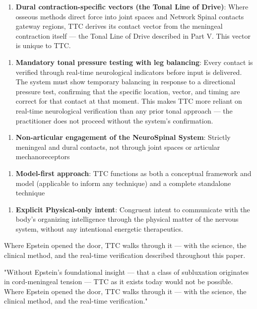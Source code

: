 \documentclass[11pt,letterpaper]{article}
\begin{document}
\begin{enumerate}
\item \textbf{Dural contraction-specific vectors (the Tonal Line of Drive)}: Where osseous methods direct force into joint spaces and Network Spinal contacts gateway regions, TTC derives its contact vector from the meningeal contraction itself — the Tonal Line of Drive described in Part V. This vector is unique to TTC.
\end{enumerate}

\begin{enumerate}
\item \textbf{Mandatory tonal pressure testing with leg balancing}: Every contact is verified through real-time neurological indicators before input is delivered. The system must show temporary balancing in response to a directional pressure test, confirming that the specific location, vector, and timing are correct for that contact at that moment. This makes TTC more reliant on real-time neurological verification than any prior tonal approach — the practitioner does not proceed without the system's confirmation.
\end{enumerate}

\begin{enumerate}
\item \textbf{Non-articular engagement of the NeuroSpinal System}: Strictly meningeal and dural contacts, not through joint spaces or articular mechanoreceptors
\end{enumerate}

\begin{enumerate}
\item \textbf{Model-first approach}: TTC functions as both a conceptual framework and model (applicable to inform any technique) and a complete standalone technique
\end{enumerate}

\begin{enumerate}
\item \textbf{Explicit Physical-only intent}: Congruent intent to communicate with the body's organizing intelligence through the physical matter of the nervous system, without any intentional energetic therapeutics.
\end{enumerate}

Where Epstein opened the door, TTC walks through it — with the science, the clinical method, and the real-time verification described throughout this paper.


\begin{pullquotebox}
"Without Epstein's foundational insight — that a class of subluxation originates in cord-meningeal tension — TTC as it exists today would not be possible. Where Epstein opened the door, TTC walks through it — with the science, the clinical method, and the real-time verification."
\end{pullquotebox}
\end{document}

